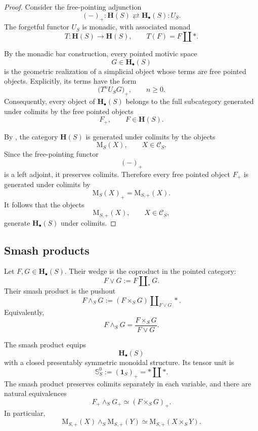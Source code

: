 \begin{proof}
Consider the free-pointing adjunction
\[
    (-)_+
    \colon
    \mathbf H(S)
    \rightleftarrows
    \mathbf H_\bullet(S)
    :
    U_S.
\]
The forgetful functor \(U_S\) is monadic, with associated monad
\[
    T
    \colon
    \mathbf H(S)
    \longrightarrow
    \mathbf H(S),
    \qquad
    T(F)
    =
    F\amalg *.
\]

By the monadic bar construction, every pointed motivic space
\[
    G
    \in
    \mathbf H_\bullet(S)
\]
is the geometric realization of a simplicial object whose terms are
free pointed objects. Explicitly, its terms have the form
\[
    \bigl(
        T^nU_SG
    \bigr)_+,
    \qquad
    n\geq0.
\]
Consequently, every object of \(\mathbf H_\bullet(S)\) belongs to the
full subcategory generated under colimits by the free pointed objects
\[
    F_+,
    \qquad
    F\in\mathbf H(S).
\]

By
,
the category \(\mathbf H(S)\) is generated under colimits by the
objects
\[
    \mathrm M_S(X),
    \qquad
    X\in\mathcal C_S.
\]
Since the free-pointing functor
\[
    (-)_+
\]
is a left adjoint, it preserves colimits. Therefore every free pointed
object \(F_+\) is generated under colimits by
\[
    \mathrm M_S(X)_+
    =
    \mathrm M_{S,+}(X).
\]
It follows that the objects
\[
    \mathrm M_{S,+}(X),
    \qquad
    X\in\mathcal C_S,
\]
generate \(\mathbf H_\bullet(S)\) under colimits.
\end{proof}

\subsection{Smash products}

\begin{construction}
\label{con:pointed-motivic-smash-product}
Let \(F,G\in\mathbf H_\bullet(S)\).  Their wedge is the coproduct in the
pointed category:
\[
    F\vee G
    :=
    F\amalg_*G.
\]
Their smash product is the pushout
\[
    F\wedge_SG
    :=
    (F\times_SG)
    \amalg_{F\vee G}
    *.
\]
Equivalently,
\[
    F\wedge_SG
    =
    \frac{F\times_SG}{F\vee G}.
\]
\end{construction}

\begin{theorem}
\label{thm:pointed-motivic-smash-monoidal}
The smash product equips
\[
    \mathbf H_\bullet(S)
\]
with a closed presentably symmetric monoidal structure.  Its tensor unit
is
\[
    \mathbb S^0_S
    :=
    (\mathbf 1_S)_+
    =
    *\amalg *.
\]
The smash product preserves colimits separately in each variable, and
there are natural equivalences
\[
    F_+\wedge_SG_+
    \simeq
    (F\times_SG)_+.
\]
In particular,
\[
    \mathrm M_{S,+}(X)
    \wedge_S
    \mathrm M_{S,+}(Y)
    \simeq
    \mathrm M_{S,+}(X\times_SY).
\]
\end{theorem}

